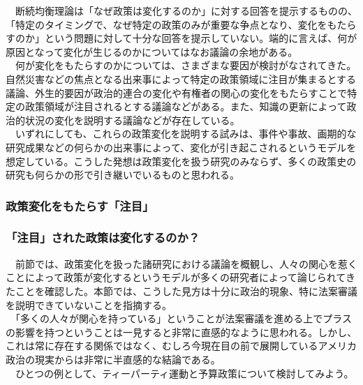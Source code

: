 　断続均衡理論は「なぜ政策は変化するのか」に対する回答を提示するものの、「特定のタイミングで、なぜ特定の政策のみが重要な争点となり、変化をもたらすのか」という問題に対して十分な回答を提示していない。端的に言えば、何が原因となって変化が生じるのかについてはなお議論の余地がある。\citep*{John2018-im}\\
　何が変化をもたらすのかについては、さまざまな要因が検討がなされてきた。自然災害などの焦点となる出来事によって特定の政策領域に注目が集まるとする議論\citep*{Birkland1997-lq,Birkland1998-xp}、外生的要因が政治的連合の変化\citep*{Sabatier1993-id}や有権者の関心の変化\citep*{Bertelli2013-zq}をもたらすことで特定の政策領域が注目されるとする議論などがある。また、知識の更新によって政治的状況の変化を説明する議論\citep*{Baumgartner2010-rl}などが存在している。\\
　いずれにしても、これらの政策変化を説明する試みは、事件や事故、画期的な研究成果などの何らかの出来事によって、変化が引き起こされるというモデルを想定している。こうした発想は政策変化を扱う研究のみならず、多くの政策史の研究も何らかの形で引き継いでいるものと思われる。\\

\subsubsection{政策変化をもたらす「注目」}

\subsubsection{「注目」された政策は変化するのか？}
　前節では、政策変化を扱った諸研究における議論を概観し、人々の関心を惹くことによって政策が変化するというモデルが多くの研究者によって論じられてきたことを確認した。本節では、こうした見方は十分に政治的現象、特に法案審議を説明できていないことを指摘する。\\
　「多くの人々が関心を持っている」ということが法案審議を進める上でプラスの影響を持つということは一見すると非常に直感的なように思われる。しかし、これは常に存在する関係ではなく、むしろ今現在目の前で展開しているアメリカ政治の現実からは非常に半直感的な結論である。\\
　ひとつの例として、ティーパーティ運動と予算政策について検討してみよう。\\